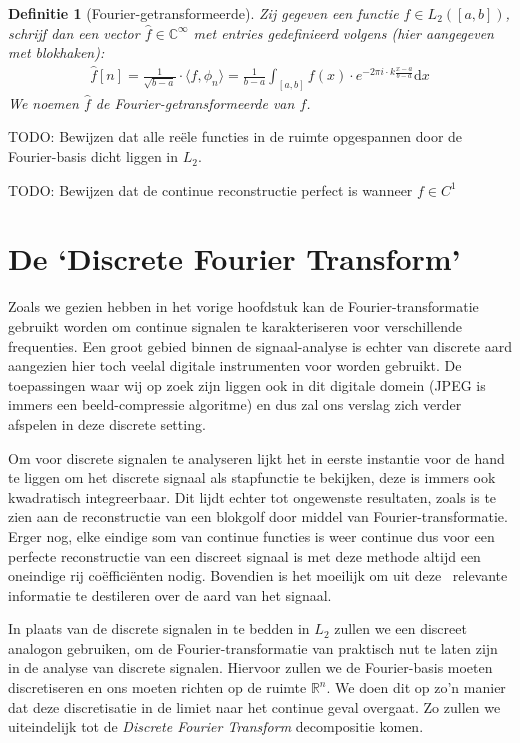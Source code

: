 \documentclass[11pt]{report}
\newcommand{\R}{\mathbb{R}}
\newcommand{\C}{\mathbb{C}}
\newtheorem*{definitie}{Definitie}
\theoremstyle{remark}
\newcommand{\eq}[1]{\begin{eqnarray*} #1 \end{eqnarray*}}
\newcommand{\coefficient}{co\"effici\"ent}
\newcommand{\dx}{\text{d}x}
\newcommand{\Ldnorm}[1]{{||#1||_{L_2}}}
\newcommand{\inpr}[2]{\langle #1 , #2 \rangle}
\begin{document}
\begin{definitie}[Fourier-getransformeerde]
Zij gegeven een functie $f\in L_2({[a,b]})$, schrijf dan een vector $\hat f \in \C^\infty$ met entries gedefinieerd volgens (hier aangegeven met blokhaken):
\eq{
  \hat f [n] = \frac{1}{\sqrt{b-a}} \cdot \inpr{f}{\phi_n} = \frac{1}{b-a} \int_{[a,b]} f(x) \cdot e^{-2 \pi i \cdot k \frac{x-a}{b-a}}\dx 
}
We noemen $\hat f$ de Fourier-getransformeerde van $f$.
\end{definitie}

TODO: Bewijzen dat alle re\"ele functies in de ruimte opgespannen door de Fourier-basis dicht liggen in $L_2$.

TODO: Bewijzen dat de continue reconstructie perfect is wanneer $f \in C^1$


\section{De `Discrete Fourier Transform'}
Zoals we gezien hebben in het vorige hoofdstuk kan de Fourier-transformatie gebruikt worden om continue signalen te karakteriseren voor verschillende frequenties. Een groot gebied binnen de signaal-analyse is echter van discrete aard aangezien hier toch veelal digitale instrumenten voor worden gebruikt. De toepassingen waar wij op zoek zijn liggen ook in dit digitale domein (JPEG is immers een beeld-compressie algoritme) en dus zal ons verslag zich verder afspelen in deze discrete setting.

Om voor discrete signalen te analyseren lijkt het in eerste instantie voor de hand te liggen om het discrete signaal als stapfunctie te bekijken, deze is immers ook kwadratisch integreerbaar. Dit lijdt echter tot ongewenste resultaten, zoals is te zien aan de reconstructie van een blokgolf door middel van Fourier-transformatie. Erger nog, elke eindige som van continue functies is weer continue dus voor een perfecte reconstructie van een discreet signaal is met deze methode altijd een oneindige rij \coefficient en nodig. Bovendien is het moeilijk om uit deze \coeffiecienten~relevante informatie te destileren over de aard van het signaal.

In plaats van de discrete signalen in te bedden in $L_2$ zullen we een discreet analogon gebruiken, om de Fourier-transformatie van praktisch nut te laten zijn in de analyse van discrete signalen. 
Hiervoor zullen we de Fourier-basis moeten discretiseren en ons moeten richten op de ruimte $\R^n$.
We doen dit op zo'n manier dat deze discretisatie in de limiet naar het continue geval overgaat. 
Zo zullen we uiteindelijk tot de \emph{Discrete Fourier Transform} decompositie komen.
\end{document}
